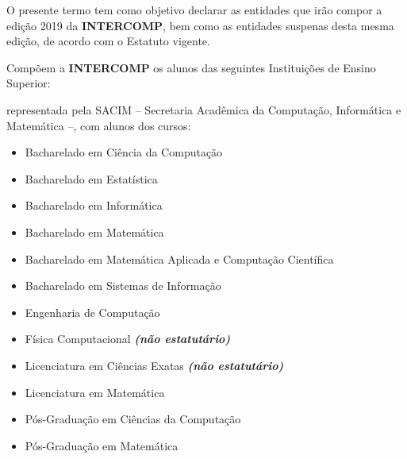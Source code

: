 
\begin{article}
	\label{art:introducao}
	O presente termo tem como objetivo declarar as entidades que irão compor a edição 2019 da \textbf{INTERCOMP}, bem como as entidades suspenas desta mesma edição, de acordo com o Estatuto vigente.
\end{article}

\begin{article}
	\label{art:integrantes}
	Compõem a \textbf{INTERCOMP} os alunos das seguintes Instituições de Ensino Superior:
	\begin{description}[noitemsep]
		\item[USP - São Carlos] representada pela SACIM -- Secretaria Acadêmica da Computação, Informática e Matemática --, com alunos dos cursos:
		\begin{itemize}[noitemsep]
			\item Bacharelado em Ciência da Computação
			\item Bacharelado em Estatística
			\item Bacharelado em Informática
			\item Bacharelado em Matemática
			\item Bacharelado em Matemática Aplicada e Computação Científica
			\item Bacharelado em Sistemas de Informação
			\item Engenharia de Computação
			\item Física Computacional \textbf{\textit{(não estatutário)}}
			\item Licenciatura em Ciências Exatas \textbf{\textit{(não estatutário)}}
			\item Licenciatura em Matemática
			\item Pós-Graduação em Ciências da Computação
			\item Pós-Graduação em Matemática
		\end{itemize}


\end{description}
\end{article}
